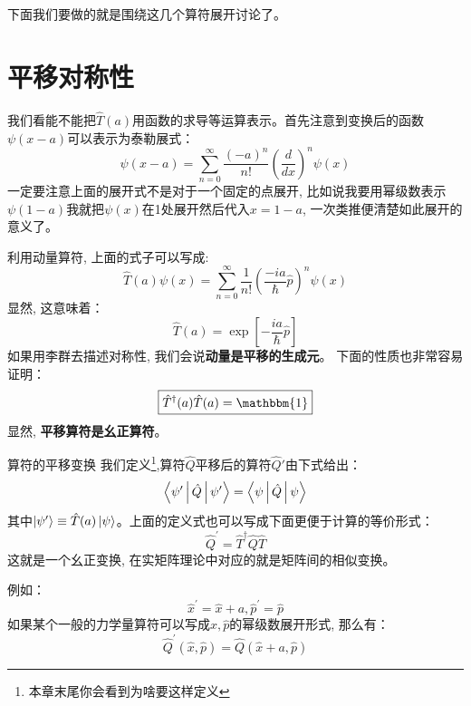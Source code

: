 \documentclass[a4paper,zihao=-4,linespread=1]{ctexrep}
\begin{document}
    下面我们要做的就是围绕这几个算符展开讨论了。
    \section{平移对称性}
    我们看能不能把$\hat{T}(a)$用函数的求导等运算表示。首先注意到变换后的函数$\psi(x-a)$可以表示为泰勒展式：
    \begin{equation}
        \label{eq:6.5}
        \psi(x-a)=\sum_{n=0}^\infty \frac{(-a)^n}{n!}\left(\frac{d}{dx}\right)^n\psi(x)
    \end{equation}
    一定要注意上面的展开式不是对于一个固定的点展开, 比如说我要用幂级数表示$\psi(1-a)$我就把$\psi(x)$在1处展开然后代入$x=1-a$, 一次类推便清楚如此展开的意义了。  
    
    利用动量算符, 上面的式子可以写成:
    \begin{equation}
        \hat{T}(a)\psi(x)=\sum_{n=0}^{\infty} \frac{1}{n !}\left(\frac{-i a}{\hbar} \hat{p}\right)^{n} \psi(x)
    \end{equation}
    显然, 这意味着：
    \begin{equation}
        \boxed{
            \hat{T}(a)=\exp \left[-\frac{i a}{\hbar} \hat{p}\right]
        }
    \end{equation}
    如果用李群去描述对称性, 我们会说\textbf{动量是平移的生成元}。
    下面的性质也非常容易证明：
    \begin{equation}
        \boxed{\hat{T}^\dagger(a)\hat{T}(a)=\mathbbm{1}}
    \end{equation}
    显然, \textbf{平移算符是幺正算符}。
    \begin{define}{算符的平移变换}
        我们定义\footnote{本章末尾你会看到为啥要这样定义},算符$\hat{Q}$平移后的算符$\hat{Q}\prime$由下式给出：
        \begin{equation}
            \Braket{\psi^\prime|\hat Q|\psi^\prime}=\Braket{\psi|\hat Q|\psi}
        \end{equation}
        其中$\ket{\psi^\prime}\equiv\hat{T}(a)\ket{\psi}$。上面的定义式也可以写成下面更便于计算的等价形式：
        \begin{equation}
            \boxed{\hat{Q}^{\prime}=\hat{T}^{\dagger} \hat{Q} \hat{T}}
        \end{equation}
        这就是一个幺正变换, 在实矩阵理论中对应的就是矩阵间的相似变换。
    \end{define}
    例如：
    $$\hat{x}^\prime=\hat x +a,\hat{p}^\prime=\hat{p}$$
    如果某个一般的力学量算符可以写成$\hat{x},\hat{p}$的幂级数展开形式, 那么有：
    \begin{equation}
        \label{eq:6.11}
        \hat{Q}^\prime(\hat x,\hat p)=\hat{Q}(\hat x+a,\hat p)
    \end{equation}
    
\end{document}
